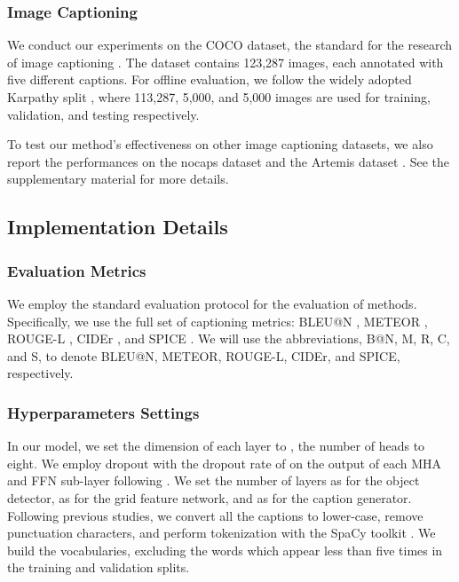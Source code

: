 \documentclass[runningheads]{llncs}
\begin{document}
\subsubsection{Image Captioning}
We conduct our experiments on the COCO dataset, the standard for the research of image captioning  \cite{lin2014microsoft}. The dataset contains 123,287 images, each annotated with five different captions. For offline evaluation, we follow the widely adopted Karpathy split \cite{karpathy}, where 113,287, 5,000, and 5,000 images are used for training, validation, and testing respectively. 

To test our method's effectiveness on other image captioning datasets, we also report the performances on the {nocaps} dataset and the Artemis dataset \cite{achlioptas2021artemis}. See the supplementary material for more details.

\subsection{Implementation Details}
\subsubsection{Evaluation Metrics} 
We employ the standard evaluation protocol for the evaluation of methods. Specifically, we use the full set of captioning metrics: BLEU@N \cite{papineni2002bleu}, METEOR \cite{banerjee2005meteor}, ROUGE-L \cite{lin2004rouge}, CIDEr \cite{vedantam2015cider}, and SPICE \cite{anderson2016spice}.
We will use the abbreviations, B@N, M, R, C, and S, to denote BLEU@N,  METEOR, ROUGE-L, CIDEr, and SPICE, respectively.

\subsubsection{Hyperparameters Settings}
In our model, we set the dimension  of each layer to , the number of heads to eight. We employ dropout with the dropout rate of  on the output of {each MHA and FFN sub-layer} following \cite{vaswani2017attention}. 
We set the number of layers as  for the object detector, as  for the grid feature network, and as  for the caption generator. Following previous studies, we convert all the captions to lower-case, remove punctuation characters, and perform tokenization with the SpaCy toolkit \cite{spacy2}. We build the vocabularies, excluding the words which appear less than five times in the training and validation splits.
\end{document}
